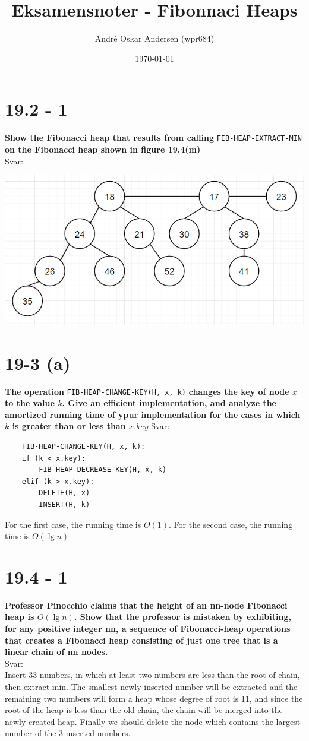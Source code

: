 \documentclass{report}
\title{Eksamensnoter - Fibonnaci Heaps}
\author{André Oskar Andersen (wpr684)}
\date{\today}
\begin{document}
\maketitle

\section*{19.2 - 1}
\textbf{Show the Fibonacci heap that results from calling} \texttt{FIB-HEAP-EXTRACT-MIN} \textbf{on the Fibonacci heap shown in figure 19.4(m)} \\
Svar: \\
\begin{center}
    \includegraphics[width = 7 cm]{../entities/19_2_1.png}
\end{center}

\section*{19-3 (a)}
\textbf{The operation} \texttt{FIB-HEAP-CHANGE-KEY(H, x, k)} \textbf{changes the key of node $x$ to the value $k$. Give an efficient implementation, and analyze the amortized running time of ypur implementation for the cases in which $k$ is greater than or less than $x.key$}
Svar:
\begin{verbatim}
    FIB-HEAP-CHANGE-KEY(H, x, k):
    if (k < x.key):
        FIB-HEAP-DECREASE-KEY(H, x, k)
    elif (k > x.key):
        DELETE(H, x)
        INSERT(H, k)
\end{verbatim}
For the first case, the running time is $O(1)$. For the second case, the running time is $O(\lg n)$

\section*{19.4 - 1}
\textbf{Professor Pinocchio claims that the height of an nn-node Fibonacci heap is $O(\lg n)$. Show that the professor is mistaken by exhibiting, for any positive integer nn, a sequence of Fibonacci-heap operations that creates a Fibonacci heap consisting of just one tree that is a linear chain of nn nodes.} \\
Svar: \\
Insert 33 numbers, in which at least two numbers are less than the root of chain, then extract-min. The smallest newly inserted number will be extracted and the remaining two numbers will form a heap whose degree of root is 11, and since the root of the heap is less than the old chain, the chain will be merged into the newly created heap. Finally we should delete the node which contains the largest number of the 3 inserted numbers.
\end{document}

